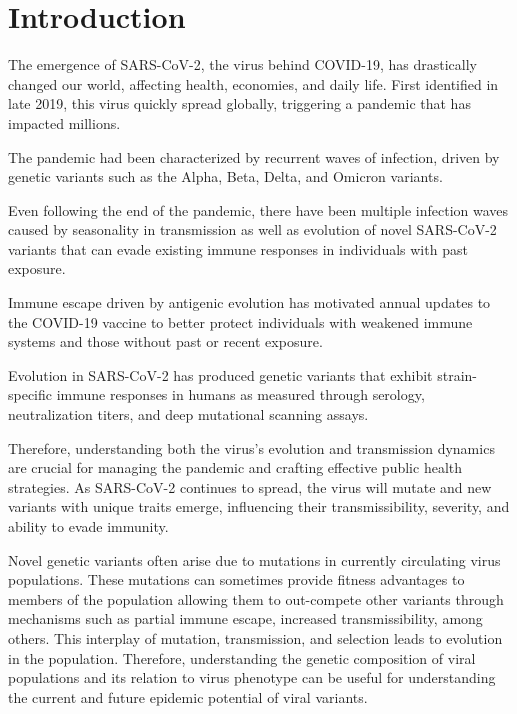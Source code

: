 \chapter{Introduction}

The emergence of SARS-CoV-2, the virus behind COVID-19, has drastically changed our world, affecting health, economies, and daily life. 
First identified in late 2019, this virus quickly spread globally, triggering a pandemic that has impacted millions.

The pandemic had been characterized by recurrent waves of infection, driven by genetic variants such as the Alpha, Beta, Delta, and Omicron variants. \cite{tegally2021detection, Volz2021, vohringer2021genomic, Earnest2021}

Even following the end of the pandemic, there have been multiple infection waves caused by seasonality in transmission as well as evolution of novel SARS-CoV-2 variants that can evade existing immune responses in individuals with past exposure. 

Immune escape driven by antigenic evolution has motivated annual updates to the COVID-19 vaccine to better protect individuals with weakened immune systems and those without past or recent exposure.

Evolution in SARS-CoV-2 has produced genetic variants that exhibit strain-specific immune responses in humans as measured through serology, neutralization titers, and deep mutational scanning assays. \cite{Bekliz2024, Jian2023, Dadonaite2023, Voss2024}

Therefore, understanding both the virus's evolution and transmission dynamics are crucial for managing the pandemic and crafting effective public health strategies.
As SARS-CoV-2 continues to spread, the virus will mutate and new variants with unique traits emerge, influencing their transmissibility, severity, and ability to evade immunity.

Novel genetic variants often arise due to mutations in currently circulating virus populations.
These mutations can sometimes provide fitness advantages to members of the population allowing them to out-compete other variants through mechanisms such as partial immune escape, increased transmissibility, among others.
This interplay of mutation, transmission, and selection leads to evolution in the population.
Therefore, understanding the genetic composition of viral populations and its relation to virus phenotype can be useful for understanding the current and future epidemic potential of viral variants.

